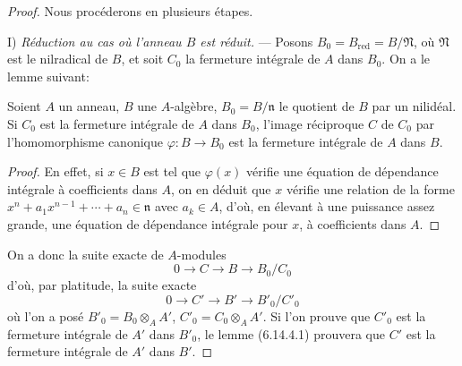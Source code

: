 \begin{proof}
Nous procéderons en plusieurs étapes.

I) \emph{Réduction au cas où l'anneau $B$ est réduit.} --- Posons
$B_0=B_{\mathrm{red}}=B/\mathfrak N$, où $\mathfrak N$ est le nilradical
de $B$, et soit $C_0$ la fermeture intégrale de $A$ dans $B_0$. On a le
lemme suivant:

\begin{lemma}[6.14.4.1]
\label{IV.2.s6.14.4.1-fr}
Soient $A$ un anneau, $B$ une $A$-algèbre, $B_0=B/\mathfrak n$ le quotient
de $B$ par un nilidéal. Si $C_0$ est la fermeture intégrale de $A$ dans
$B_0$, l'image réciproque $C$ de $C_0$ par l'homomorphisme canonique
$\varphi:B\to B_0$ est la fermeture intégrale de $A$ dans $B$.
\end{lemma}

\begin{proof}
En effet, si $x\in B$ est tel que $\varphi(x)$ vérifie une équation de
dépendance intégrale à coefficients dans $A$, on en déduit que $x$ vérifie
une relation de la forme
$x^n+a_1x^{n-1}+\cdots+a_n\in\mathfrak n$ avec $a_k\in A$, d'où, en
élevant à une puissance assez grande, une équation de dépendance intégrale
pour $x$, à coefficients dans $A$.
\end{proof}

On a donc la suite exacte de $A$-modules
\[
0\longrightarrow C\longrightarrow B\longrightarrow B_0/C_0
\]
d'où, par platitude, la suite exacte
\[
0\longrightarrow C'\longrightarrow B'\longrightarrow B'_0/C'_0
\]
où l'on a posé $B'_0=B_0\otimes_A A'$, $C'_0=C_0\otimes_A A'$. Si l'on
prouve que $C'_0$ est la fermeture intégrale de $A'$ dans $B'_0$, le lemme
(6.14.4.1) prouvera que $C'$ est la fermeture intégrale de $A'$ dans $B'$.


\end{proof}
